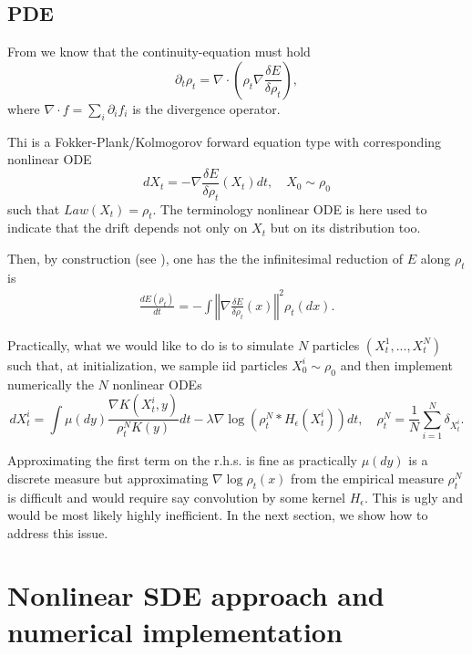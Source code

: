 \documentclass[a4paper]{article}
\begin{document}
\subsection{PDE}
From \citet[Definition 11.1.1]{ambrosio2008gradient} we know that the continuity-equation must hold
\begin{equation}
\label{eq:pde}
\partial_{t}\rho_{t}=\nabla\cdot\left(\rho_{t}\nabla\frac{\delta E}{\delta\rho_{t}}\right),
\end{equation}
where $\nabla\cdot f=\sum_{i}\partial_{i}f_{i}$ is the divergence operator.

Thi is a Fokker-Plank/Kolmogorov forward equation type with corresponding nonlinear ODE \citep{jordan1998variational}
\begin{equation}
dX_{t}=-\nabla\frac{\delta E}{\delta\rho_{t}}\left(X_{t}\right)dt,\quad X_{0}\sim\rho_{0}\label{eq:nonlinearODE}
\end{equation}
such that $Law(X_{t})=\rho_{t}$.
The terminology nonlinear ODE is here used to indicate that the drift depends not only on $X_{t}$ but on its distribution too.

Then, by construction (see \citet[page 14]{arbel2019maximum}), one has the the infinitesimal reduction of $E$ along $\rho_t$ is
\begin{align*}
\frac{dE\left(\rho_{t}\right)}{dt}=-\int\left\Vert \nabla\frac{\delta E}{\delta\rho_{t}}\left(x\right)\right\Vert ^{2}\rho_{t}\left(dx\right).
\end{align*}


Practically, what we would like to do is to simulate $N$ particles $(X_{t}^{1},...,X_{t}^{N})$ such that, at initialization, we sample iid particles  $X_{0}^{i}\sim\rho_{0}$ and then implement numerically the $N$ nonlinear ODEs
\[
dX_{t}^{i}=\int\mu\left(dy\right)\frac{\nabla K(X_{t}^{i},y)}{\rho_{t}^{N}K(y)}dt-\lambda\nabla\log\left(\rho_{t}^{N}*H_{\epsilon}\left(X_{t}^{i}\right)\right)dt,\quad\rho_{t}^{N}=\frac{1}{N}\sum_{i=1}^{N}\delta_{X_{t}^{i}}.
\]

Approximating the first term on the r.h.s. is fine as practically $\mu\left(dy\right)$ is a discrete measure but approximating $\nabla\log\rho_{t}\left(x\right)$ from the empirical measure $\rho_{t}^{N}$ is difficult and would require say convolution by some kernel $H_{\epsilon}$.
This is ugly and would be most likely highly inefficient.
In the next section, we show how to address this issue.


\section{Nonlinear SDE approach and numerical implementation}
\end{document}
